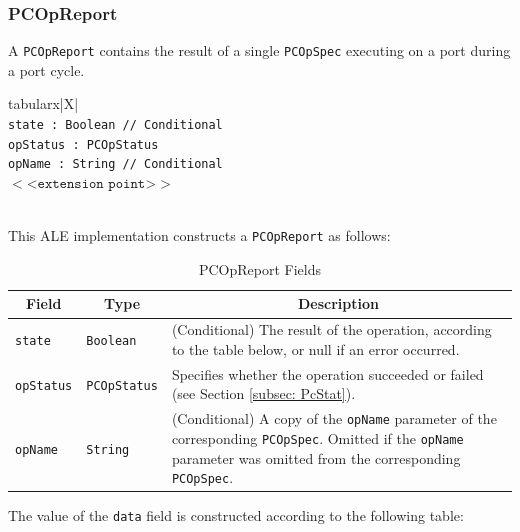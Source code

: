 \documentclass[11pt,a4paper,oneside]{article}
\newenvironment{bbox}%
{\begin{table}[h!]\begin{threeparttable}}%
{\end{threeparttable}\end{table}\FloatBarrier}
\newenvironment{bbox}
{\ifvmode\IgnorePar\fi \EndP\Tg<div class='bbox'>}{\Tg</div>\IgnoreIndent}
\begin{document}
\subsubsection{PCOpReport}
A \texttt{PCOpReport} contains the result of a single \texttt{PCOpSpec} executing on a port during a port cycle.

\begin{bbox}
\begin{edtable}{tabularx}{\linewidth}{|X|}
\hline 
{}
\\
\texttt{state : Boolean // Conditional}\\
\texttt{opStatus : PCOpStatus}\\
\texttt{opName : String // Conditional}\\
$<$<$\texttt{extension point}$>$>$\\
\texttt{\textendash \textendash \textendash}\\
\hline
\end{edtable}
\end{bbox}

This ALE implementation constructs a \texttt{PCOpReport} as follows:

\begin{table}[!h]
\begin{tabularx}{\linewidth}{|l|l|X|}
\hline
\multicolumn{1}{|c|}{\textbf{Field}}&
\multicolumn{1}{c|}{\textbf{Type}}&
\multicolumn{1}{c|}{\textbf{Description}}\\
\hline 
\texttt{state} &\texttt{Boolean}&(Conditional) The result of the operation, according to the table below, or null if an error occurred.\\ \hline 
\texttt{opStatus} &\texttt{PCOpStatus}&Specifies whether the operation succeeded or failed (see Section \ref{subsec: PcStat}). \\ \hline 
\texttt{opName}&\texttt{String}&(Conditional) A copy of the \texttt{opName} parameter of the corresponding \texttt{PCOpSpec}. Omitted if the \texttt{opName} parameter was omitted from the corresponding \texttt{PCOpSpec}.\\
\hline
\end{tabularx}
\caption{PCOpReport Fields}
\MakeLineNo
\end{table}
\FloatBarrier

The value of the \texttt{data} field is constructed according to the following table:
\end{document}
